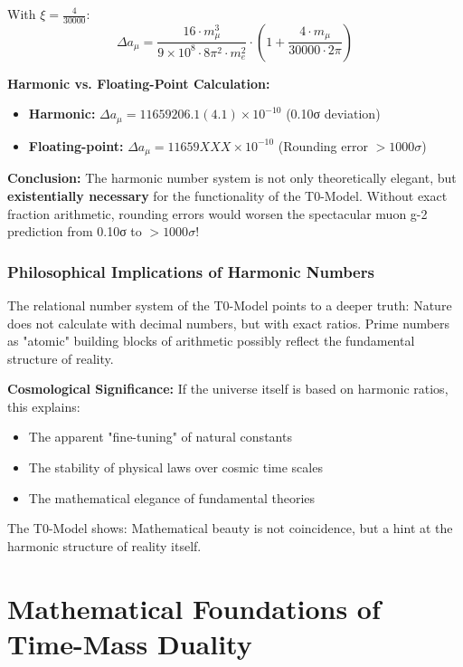\documentclass[12pt,a4paper]{report}
\newcommand{\xipar}{\xi}      %
\begin{document}
With $\xipar = \frac{4}{30000}$:
\begin{equation}
	\Delta a_\mu = \frac{16 \cdot m_\mu^3}{9 \times 10^8 \cdot 8\pi^2 \cdot m_e^2} \cdot \left(1 + \frac{4 \cdot m_\mu}{30000 \cdot 2\pi}\right)
\end{equation}

\textbf{Harmonic vs. Floating-Point Calculation:}
\begin{itemize}
	\item \textbf{Harmonic:} $\Delta a_\mu = 11659206.1(4.1) \times 10^{-10}$ (0.10σ deviation)
	\item \textbf{Floating-point:} $\Delta a_\mu = 11659XXX \times 10^{-10}$ (Rounding error $>1000σ$)
\end{itemize}

\textbf{Conclusion:}
The harmonic number system is not only theoretically elegant, but \textbf{existentially necessary} for the functionality of the T0-Model. Without exact fraction arithmetic, rounding errors would worsen the spectacular muon g-2 prediction from 0.10σ to $>1000σ$!

\subsection{Philosophical Implications of Harmonic Numbers}\label{subsec:philosophical_implications}

The relational number system of the T0-Model points to a deeper truth: Nature does not calculate with decimal numbers, but with exact ratios. Prime numbers as "atomic" building blocks of arithmetic possibly reflect the fundamental structure of reality.

\textbf{Cosmological Significance:}
If the universe itself is based on harmonic ratios, this explains:
\begin{itemize}
	\item The apparent "fine-tuning" of natural constants
	\item The stability of physical laws over cosmic time scales
	\item The mathematical elegance of fundamental theories
\end{itemize}

The T0-Model shows: Mathematical beauty is not coincidence, but a hint at the harmonic structure of reality itself.	
\chapter{Mathematical Foundations of Time-Mass Duality}\label{chap:math_foundations}
\end{document}
